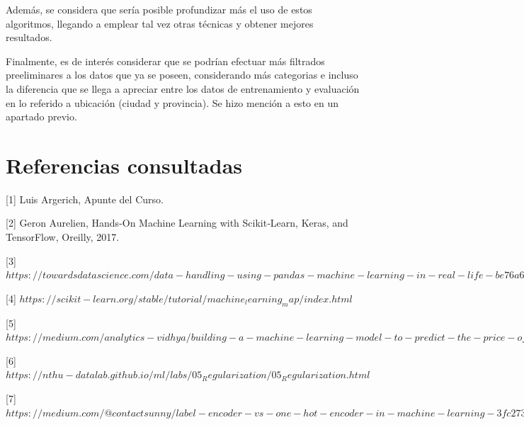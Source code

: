 \documentclass[titlepage,a4paper,11pt]{article}
\begin{document}
Además, se considera que sería posible profundizar más el uso de estos algoritmos, llegando a emplear tal vez otras técnicas y obtener mejores resultados.

Finalmente, es de interés considerar que se podrían efectuar más filtrados preeliminares a los datos que ya se poseen, considerando más categorias e incluso la diferencia que se llega a apreciar entre los datos de entrenamiento y evaluación en lo referido a ubicación (ciudad y provincia). Se hizo mención a esto en un apartado previo.

\section{Referencias consultadas}
[1] Luis Argerich, Apunte del Curso.

[2] Geron Aurelien, Hands‑On Machine Learning with Scikit‑Learn, Keras, and TensorFlow, Oreilly, 2017.

[3] $https://towardsdatascience.com/data-handling-using-pandas-machine-learning-in-real-life-be76a697418c$

[4] $https://scikit-learn.org/stable/tutorial/machine_learning_map/index.html$

[5] $https://medium.com/analytics-vidhya/building-a-machine-learning-model-to-predict-the-price-of-the-car-bc51783ba2f3$

[6] $https://nthu-datalab.github.io/ml/labs/05_Regularization/05_Regularization.html$

[7] $https://medium.com/@contactsunny/label-encoder-vs-one-hot-encoder-in-machine-learning-3fc273365621$
\end{document}
